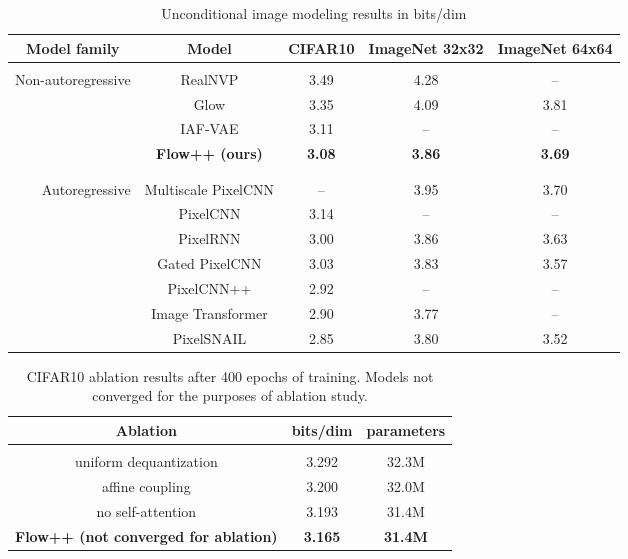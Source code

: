 \documentclass{article}
\begin{document}
\begin{table*}[t]
\small
\caption{Unconditional image modeling results in bits/dim}
\label{table:cifar10}
\begin{center}
\begin{tabular}{r|cccc}
\multicolumn{1}{c}{\bf Model family} & \multicolumn{1}{c}{\bf Model} &\multicolumn{1}{c}{\bf CIFAR10} &\multicolumn{1}{c}{\bf ImageNet 32x32}
&\multicolumn{1}{c}{\bf ImageNet 64x64}
\\ \hline \\
Non-autoregressive & RealNVP \citep{dinh2016density} & 3.49 & 4.28 & -- \\
 & Glow \citep{kingma2018glow} & 3.35 & 4.09 & 3.81 \\
 & IAF-VAE \citep{kingma2016improving} & 3.11 & -- & -- \\
 & {\bf Flow++ (ours)} & {\bf 3.08} & {\bf 3.86} & {\bf 3.69} \\
\\ \hline \\
Autoregressive & Multiscale PixelCNN \citep{reed2017parallel} & -- & 3.95 & 3.70 \\
 & PixelCNN \citep{oord2016pixel} & 3.14 & -- & -- \\ 
 & PixelRNN \citep{oord2016pixel} & 3.00 & 3.86 & 3.63 \\ 
 & Gated PixelCNN \citep{oord2016conditional} & 3.03 & 3.83 & 3.57 \\
 & PixelCNN++ \citep{salimans2017pixelcnn++} & 2.92 & -- & --\\
 & Image Transformer \citep{parmar2018image} & 2.90 & 3.77 & -- \\
 & PixelSNAIL \citep{chen2017pixelsnail} & 2.85 & 3.80 & 3.52 \\
\end{tabular}
\end{center}
\end{table*}



\begin{table}[h]
\small
\caption{CIFAR10 ablation results after 400 epochs of training. Models not converged for the purposes of ablation study.}
\label{table:ablations}
\begin{center}
\begin{tabular}{ccc}
\multicolumn{1}{c}{\bf Ablation}  &\multicolumn{1}{c}{\bf bits/dim} &\multicolumn{1}{c}{\bf parameters} 
\\ \hline \\
uniform dequantization & 3.292 & 32.3M \\
affine coupling & 3.200 & 32.0M \\
no self-attention & 3.193 & 31.4M \\
{\bf Flow++ (not converged for ablation)} & {\bf 3.165} & {\bf 31.4M}
\end{tabular}
\end{center}
\end{table}
\end{document}
